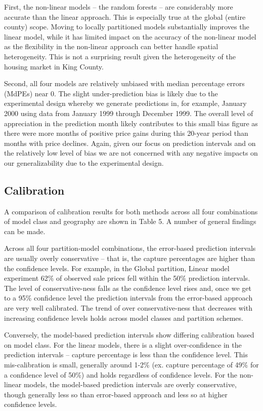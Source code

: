 \documentclass[colTwo]{anon}
\theoremstyle{definition}
\begin{document}
First, the non-linear models -- the random forests -- are considerably more accurate than the linear approach. This is especially true at the global (entire county) scope.  Moving to locally partitioned models substantially improves the linear model, while it has limited impact on the accuracy of the non-linear model as the flexibility in the non-linear approach can better handle spatial heterogeneity.  This is not a surprising result given the heterogeneity of the housing market in King County.

Second, all four models are relatively unbiased with median percentage errors (MdPEs) near 0.  The slight under-prediction bias is likely due to the experimental design whereby we generate predictions in, for example, January 2000 using data from January 1999 through December 1999.  The overall level of appreciation in the prediction month likely contributes to this small bias figure as there were more months of positive price gains during this 20-year period than months with price declines.  Again, given our focus on prediction intervals and on the relatively low level of bias we are not concerned with any negative impacts on our generalizability due to the experimental design.

\subsection{Calibration}

A comparison of calibration results for both methods across all four combinations of model class and geography are shown in Table 5.  A number of general findings can be made.

Across all four partition-model combinations, the error-based prediction intervals are usually overly conservative -- that is, the capture percentages are higher than the confidence levels.  For example, in the Global partition, Linear model experiment 62\% of observed sale prices fell within the 50\% prediction intervals.  The level of conservative-ness falls as the confidence level rises and, once we get to a 95\% confidence level the prediction intervals from the error-based approach are very well calibrated.  The trend of over conservative-ness that decreases with increasing confidence levels holds across model classes and partition schemes.

Conversely, the model-based prediction intervals show differing calibration based on model class.  For the linear models, there is a slight over-confidence in the prediction intervals -- capture percentage is less than the confidence level.  This mis-calibration is small, generally around 1-2\% (ex. capture percentage of 49\% for a confidence level of 50\%) and holds regardless of confidence levels. For the non-linear models, the model-based prediction intervals are overly conservative, though generally less so than error-based approach and less so at higher confidence levels.
\end{document}
